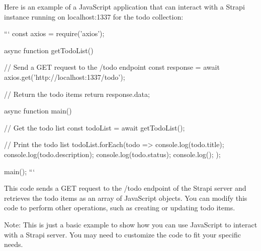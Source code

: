 Here is an example of a JavaScript application that can interact with a Strapi instance running on localhost:1337 for the todo collection:

```
const axios = require('axios');

async function getTodoList() {
  // Send a GET request to the /todo endpoint
  const response = await axios.get('http://localhost:1337/todo');

  // Return the todo items
  return response.data;
}

async function main() {
  // Get the todo list
  const todoList = await getTodoList();

  // Print the todo list
  todoList.forEach(todo => {
    console.log(todo.title);
    console.log(todo.description);
    console.log(todo.status);
    console.log();
  });
}

main();
```

This code sends a GET request to the /todo endpoint of the Strapi server and retrieves the todo items as an array of JavaScript objects. You can modify this code to perform other operations, such as creating or updating todo items.

Note: This is just a basic example to show how you can use JavaScript to interact with a Strapi server. You may need to customize the code to fit your specific needs.